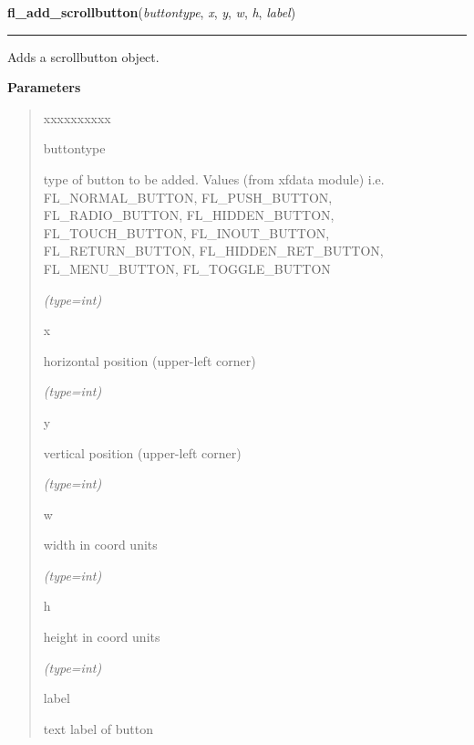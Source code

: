 \hspace{.8\funcindent}\begin{boxedminipage}{\funcwidth}

    \raggedright \textbf{fl\_add\_scrollbutton}(\textit{buttontype}, \textit{x}, \textit{y}, \textit{w}, \textit{h}, \textit{label})

    \vspace{-1.5ex}

    \rule{\textwidth}{0.5\fboxrule}
\setlength{\parskip}{2ex}
    Adds a scrollbutton object.

\setlength{\parskip}{1ex}
      \textbf{Parameters}
      \vspace{-1ex}

      \begin{quote}
        \begin{Ventry}{xxxxxxxxxx}

          \item[buttontype]

          type of button to be added. Values (from xfdata module) i.e. 
          FL\_NORMAL\_BUTTON, FL\_PUSH\_BUTTON, FL\_RADIO\_BUTTON, 
          FL\_HIDDEN\_BUTTON, FL\_TOUCH\_BUTTON, FL\_INOUT\_BUTTON, 
          FL\_RETURN\_BUTTON, FL\_HIDDEN\_RET\_BUTTON, FL\_MENU\_BUTTON, 
          FL\_TOGGLE\_BUTTON

            {\it (type=int)}

          \item[x]

          horizontal position (upper-left corner)

            {\it (type=int)}

          \item[y]

          vertical position (upper-left corner)

            {\it (type=int)}

          \item[w]

          width in coord units

            {\it (type=int)}

          \item[h]

          height in coord units

            {\it (type=int)}

          \item[label]

          text label of button


\end{Ventry}
\end{quote}
\end{boxedminipage}
